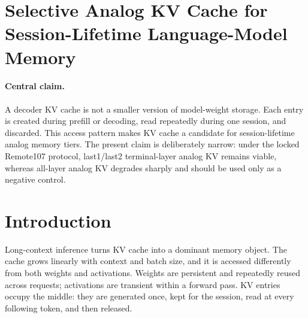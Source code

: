 
\section*{Selective Analog KV Cache for Session-Lifetime Language-Model Memory}

\begin{abstract}
Decoder-only language models store Key/Value tensors that are written during prefill or decoding, read repeatedly during one session, and discarded. This lifetime is different from both permanent model weights and short-lived activation buffers, making KV cache a distinct memory workload. We study whether analog memory should be used for the whole KV cache or only for selected layers. Under the locked Remote107 protocol for Pythia-410M on WikiText-2 raw-v1, last1/last2 terminal-layer scopes remain viable while all-layer analog KV degrades sharply. The result supports a selective analog cache tier and does not claim energy, endurance, refresh, long-context, or larger-model closure.
\end{abstract}

\paragraph{Central claim.}
A decoder KV cache is not a smaller version of model-weight storage. Each entry is created during prefill or decoding, read repeatedly during one session, and discarded. This access pattern makes KV cache a candidate for session-lifetime analog memory tiers. The present claim is deliberately narrow: under the locked Remote107 protocol, last1/last2 terminal-layer analog KV remains viable, whereas all-layer analog KV degrades sharply and should be used only as a negative control.

\section{Introduction}

Long-context inference turns KV cache into a dominant memory object. The cache grows linearly with context and batch size, and it is accessed differently from both weights and activations. Weights are persistent and repeatedly reused across requests; activations are transient within a forward pass. KV entries occupy the middle: they are generated once, kept for the session, read at every following token, and then released.

